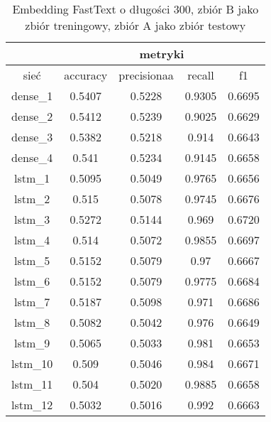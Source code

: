 \begin{table}[] \centering
    \caption{Embedding FastText o długości 300, zbiór B jako zbiór treningowy, zbiór A jako zbiór testowy }
    \label{tab:wyniki_300_eks2}
    \begin{tabular}{|c|c|c|c|c|}
        \hline
                 & \multicolumn{4}{c|}{metryki}                                 \\ \hline
        sieć     & accuracy                     & precisionaa & recall & f1     \\ \hline
        dense\_1 & 0.5407                       & 0.5228      & 0.9305 & 0.6695 \\ \hline
        dense\_2 & 0.5412                       & 0.5239      & 0.9025 & 0.6629 \\ \hline
        dense\_3 & 0.5382                       & 0.5218      & 0.914  & 0.6643 \\ \hline
        dense\_4 & 0.541                        & 0.5234      & 0.9145 & 0.6658 \\ \hline
        lstm\_1  & 0.5095                       & 0.5049      & 0.9765 & 0.6656 \\ \hline
        lstm\_2  & 0.515                        & 0.5078      & 0.9745 & 0.6676 \\ \hline
        lstm\_3  & 0.5272                       & 0.5144      & 0.969  & 0.6720 \\ \hline
        lstm\_4  & 0.514                        & 0.5072      & 0.9855 & 0.6697 \\ \hline
        lstm\_5  & 0.5152                       & 0.5079      & 0.97   & 0.6667 \\ \hline
        lstm\_6  & 0.5152                       & 0.5079      & 0.9775 & 0.6684 \\ \hline
        lstm\_7  & 0.5187                       & 0.5098      & 0.971  & 0.6686 \\ \hline
        lstm\_8  & 0.5082                       & 0.5042      & 0.976  & 0.6649 \\ \hline
        lstm\_9  & 0.5065                       & 0.5033      & 0.981  & 0.6653 \\ \hline
        lstm\_10 & 0.509                        & 0.5046      & 0.984  & 0.6671 \\ \hline
        lstm\_11 & 0.504                        & 0.5020      & 0.9885 & 0.6658 \\ \hline
        lstm\_12 & 0.5032                       & 0.5016      & 0.992  & 0.6663 \\ \hline

\end{tabular}
\end{table}
